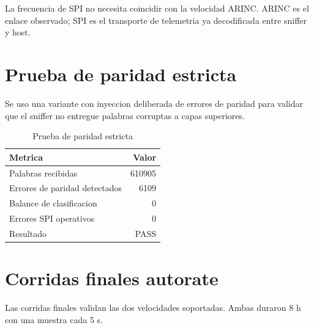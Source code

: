 \documentclass[12pt,a4paper,oneside]{report}
\begin{document}
La frecuencia de SPI no necesita coincidir con la velocidad ARINC. ARINC es el
enlace observado; SPI es el transporte de telemetria ya decodificada entre
sniffer y host.

\section{Prueba de paridad estricta}

Se uso una variante con inyeccion deliberada de errores de paridad para validar
que el sniffer no entregue palabras corruptas a capas superiores.

\begin{table}[H]
\centering
\caption{Prueba de paridad estricta}
\begin{tabular}{lr}
\toprule
Metrica & Valor \\
\midrule
Palabras recibidas & 610905 \\
Errores de paridad detectados & 6109 \\
Balance de clasificacion & 0 \\
Errores SPI operativos & 0 \\
Resultado & PASS \\
\bottomrule
\end{tabular}
\end{table}

\section{Corridas finales autorate}

Las corridas finales validan las dos velocidades soportadas. Ambas duraron 8 h
con una muestra cada 5 s.
\end{document}
